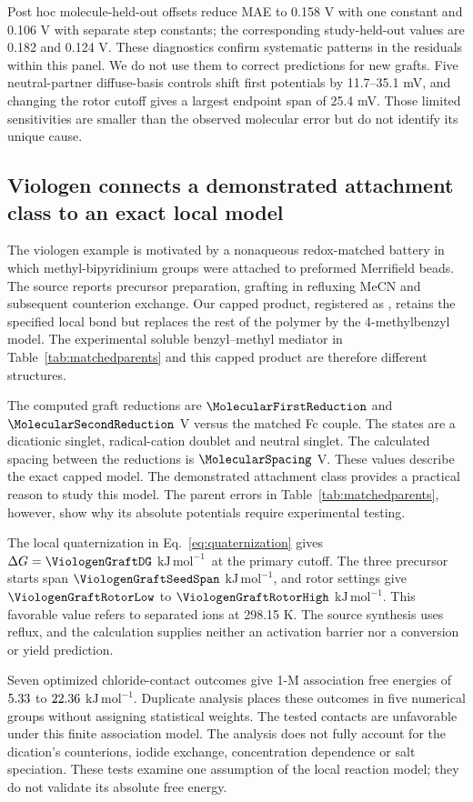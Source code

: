 \documentclass[11pt]{article}
\newcommand{\kj}{\ensuremath{\mathrm{kJ\,mol^{-1}}}}
\begin{document}
Post hoc molecule-held-out offsets reduce MAE to 0.158 V with one constant and 0.106 V with separate step constants; the corresponding study-held-out values are 0.182 and 0.124 V. These diagnostics confirm systematic patterns in the residuals within this panel. We do not use them to correct predictions for new grafts. Five neutral-partner diffuse-basis controls shift first potentials by 11.7--35.1 mV, and changing the rotor cutoff gives a largest endpoint span of 25.4 mV. Those limited sensitivities are smaller than the observed molecular error but do not identify its unique cause.\cite{elhajj2024}

\subsection{Viologen connects a demonstrated attachment class to an exact local model}
The viologen example is motivated by a nonaqueous redox-matched battery in which methyl-bipyridinium groups were attached to preformed Merrifield beads.\cite{kim2022} The source reports precursor preparation, grafting in refluxing MeCN and subsequent counterion exchange. Our capped product, registered as , retains the specified local bond but replaces the rest of the polymer by the 4-methylbenzyl model. The experimental soluble benzyl--methyl mediator in Table~\ref{tab:matchedparents} and this capped product are therefore different structures.

The computed graft reductions are $\MolecularFirstReduction$ and $\MolecularSecondReduction$ V versus the matched Fc couple. The states are a dicationic singlet, radical-cation doublet and neutral singlet. The calculated spacing between the reductions is $\MolecularSpacing$ V. These values describe the exact capped model. The demonstrated attachment class provides a practical reason to study this model. The parent errors in Table~\ref{tab:matchedparents}, however, show why its absolute potentials require experimental testing.

The local quaternization in Eq.~\ref{eq:quaternization} gives $\Delta G=\ViologenGraftDG$ \kj\ at the primary cutoff. The three precursor starts span $\ViologenGraftSeedSpan$ \kj, and rotor settings give $\ViologenGraftRotorLow$ to $\ViologenGraftRotorHigh$ \kj. This favorable value refers to separated ions at 298.15 K. The source synthesis uses reflux, and the calculation supplies neither an activation barrier nor a conversion or yield prediction.

Seven optimized chloride-contact outcomes give 1-M association free energies of $5.33$ to $22.36$ \kj. Duplicate analysis places these outcomes in five numerical groups without assigning statistical weights. The tested contacts are unfavorable under this finite association model. The analysis does not fully account for the dication's counterions, iodide exchange, concentration dependence or salt speciation. These tests examine one assumption of the local reaction model; they do not validate its absolute free energy.
\end{document}
